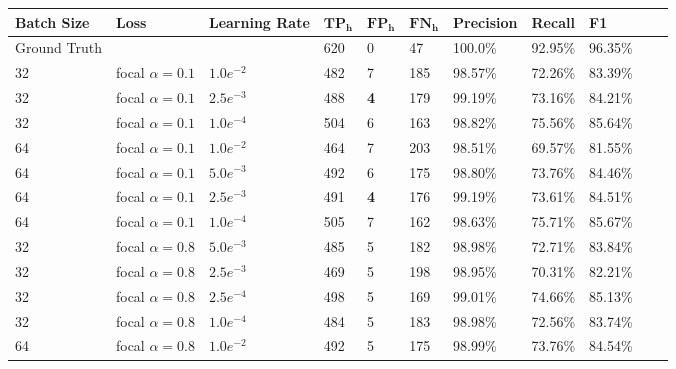 \begin{table}
\footnotesize
\begin{center}
\begin{tabular}{|l|l|l|l|l|l|l|l|l|l|l|}

\hline
\textbf{Batch Size} & \textbf{Loss}      & \textbf{Learning Rate} & $\mathbf{TP_h}$  & $\mathbf{FP_h}$ & $\mathbf{FN_h}$  & \textbf{Precision} & \textbf{Recall}  & \textbf{F1}      \\
\hline
Ground Truth        &                    &                        & 620 & 0  & 47  & 100.0\%   & 92.95\% & 96.35\% \\
\hline
32                  & focal $\alpha=0.1$ & $1.0e^{-2}$            & 482 & 7  & 185 & 98.57\%   & 72.26\% & 83.39\% \\
\hline
32                  & focal $\alpha=0.1$ & $2.5e^{-3}$            & 488 & \textbf{4}  & 179 & 99.19\%   & 73.16\% & 84.21\% \\
\hline
32                  & focal $\alpha=0.1$ & $1.0e^{-4}$            & 504 & 6  & 163 & 98.82\%   & 75.56\% & 85.64\% \\
\hline
64                  & focal $\alpha=0.1$ & $1.0e^{-2}$            & 464 & 7  & 203 & 98.51\%   & 69.57\% & 81.55\% \\
\hline
64                  & focal $\alpha=0.1$ & $5.0e^{-3}$            & 492 & 6  & 175 & 98.80\%   & 73.76\% & 84.46\% \\
\hline
64                  & focal $\alpha=0.1$ & $2.5e^{-3}$            & 491 & \textbf{4}  & 176 & 99.19\%   & 73.61\% & 84.51\% \\
\hline
64                  & focal $\alpha=0.1$ & $1.0e^{-4}$            & 505 & 7  & 162 & 98.63\%   & 75.71\% & 85.67\% \\
\hline
32                  & focal $\alpha=0.8$ & $5.0e^{-3}$            & 485 & 5  & 182 & 98.98\%   & 72.71\% & 83.84\% \\
\hline
32                  & focal $\alpha=0.8$ & $2.5e^{-3}$            & 469 & 5  & 198 & 98.95\%   & 70.31\% & 82.21\% \\
\hline
32                  & focal $\alpha=0.8$ & $2.5e^{-4}$            & 498 & 5  & 169 & 99.01\%   & 74.66\% & 85.13\% \\
\hline
32                  & focal $\alpha=0.8$ & $1.0e^{-4}$            & 484 & 5  & 183 & 98.98\%   & 72.56\% & 83.74\% \\
\hline
64                  & focal $\alpha=0.8$ & $1.0e^{-2}$            & 492 & 5  & 175 & 98.99\%   & 73.76\% & 84.54\% \\

\end{tabular}
\end{center}
\end{table}
